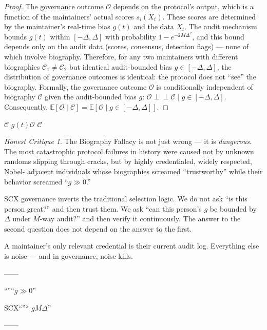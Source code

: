 \documentclass[12pt,a4paper]{article}
\theoremstyle{remark}
\newcommand{\E}{\mathbb{E}}
\newtheorem{honesthit}{Honest Critique}[section]
\newenvironment{hitbox}{%
  \begin{center}
  \color{red}
  \begin{minipage}{0.92\textwidth}
  \begin{honesthit}
}{%
  \end{honesthit}
  \end{minipage}
  \end{center}
}
\begin{document}
\begin{proof}
The governance outcome $\mathcal{O}$ depends on the protocol's output, which
is a function of the maintainers' actual scores $s_i(X_t)$. These scores are
determined by the maintainer's real-time bias $g(t)$ and the data $X_t$.
The audit mechanism bounds $g(t)$ within $[-\Delta, \Delta]$ with probability
$1 - e^{-2M\Delta^2}$, and this bound depends only on the audit data (scores,
consensus, detection flags) — none of which involve biography. Therefore,
for any two maintainers with different biographies $\mathcal{C}_1 \neq \mathcal{C}_2$
but identical audit-bounded bias $g \in [-\Delta, \Delta]$, the distribution
of governance outcomes is identical: the protocol does not ``see'' the
biography. Formally, the governance outcome $\mathcal{O}$ is conditionally
independent of biography $\mathcal{C}$ given the audit-bounded bias $g$:
$\mathcal{O} \perp\!\!\!\perp \mathcal{C} \mid g \in [-\Delta, \Delta]$.
Consequently, $\E[\mathcal{O} \mid \mathcal{C}] = \E[\mathcal{O} \mid g \in [-\Delta, \Delta]]$.
\end{proof}

\noindent\textbf{}
$\mathcal{C}$
$g(t)$$\mathcal{O}$
$\mathcal{C}$


\begin{hitbox}
The Biography Fallacy is not just wrong — it is \textit{dangerous}. The most
catastrophic protocol failures in history were caused not by unknown randoms
slipping through cracks, but by highly credentialed, widely respected, Nobel-
adjacent individuals whose biographies screamed ``trustworthy'' while their
behavior screamed ``$g \gg 0$.''

SCX governance inverts the traditional selection logic. We do not ask ``is this
person great?'' and then trust them. We ask ``can this person's $g$ be bounded
by $\Delta$ under $M$-way audit?'' and then verify it continuously. The answer
to the second question does not depend on the answer to the first.

A maintainer's only relevant credential is their current audit log. Everything
else is noise — and in governance, noise kills.

\begin{center}
\small\textbf{}
——

“”“$g \gg 0$”

SCX“”“
$g$$M$$\Delta$”


——
\end{center}
\end{hitbox}
\end{document}

